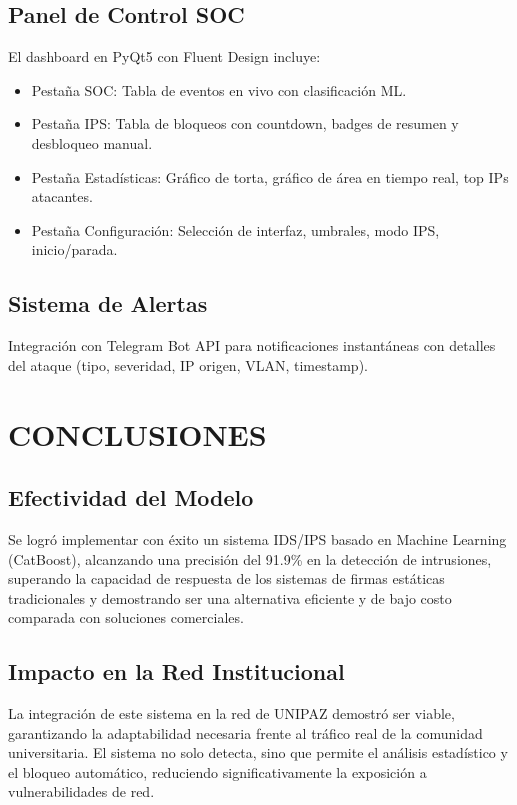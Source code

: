 \documentclass[12pt,letterpaper]{report}
\begin{document}
\section{Panel de Control SOC}

El dashboard en PyQt5 con Fluent Design incluye:
\begin{itemize}
  \item Pestaña SOC: Tabla de eventos en vivo con clasificación ML.
  \item Pestaña IPS: Tabla de bloqueos con countdown, badges de resumen y desbloqueo manual.
  \item Pestaña Estadísticas: Gráfico de torta, gráfico de área en tiempo real, top IPs atacantes.
  \item Pestaña Configuración: Selección de interfaz, umbrales, modo IPS, inicio/parada.
\end{itemize}

\section{Sistema de Alertas}

Integración con Telegram Bot API para notificaciones instantáneas con detalles del ataque (tipo, severidad, IP origen, VLAN, timestamp).

\chapter{CONCLUSIONES}

\section{Efectividad del Modelo}

Se logró implementar con éxito un sistema IDS/IPS basado en Machine Learning (CatBoost), alcanzando una precisión del 91.9\% en la detección de intrusiones, superando la capacidad de respuesta de los sistemas de firmas estáticas tradicionales y demostrando ser una alternativa eficiente y de bajo costo comparada con soluciones comerciales.

\section{Impacto en la Red Institucional}

La integración de este sistema en la red de UNIPAZ demostró ser viable, garantizando la adaptabilidad necesaria frente al tráfico real de la comunidad universitaria. El sistema no solo detecta, sino que permite el análisis estadístico y el bloqueo automático, reduciendo significativamente la exposición a vulnerabilidades de red.
\end{document}
